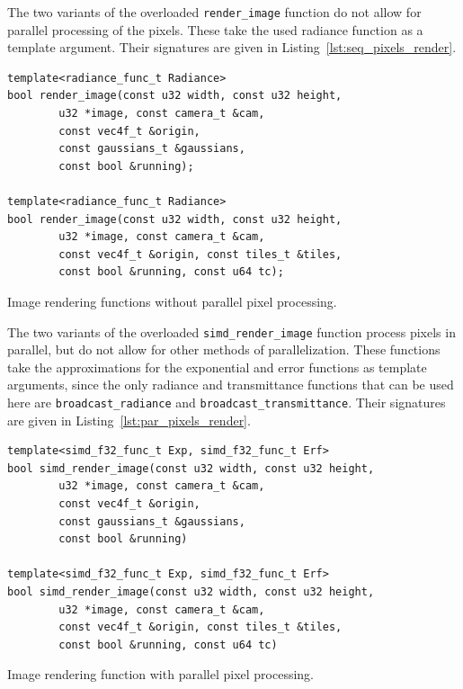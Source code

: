 \documentclass[a4paper, 11pt]{memoir}
\begin{document}
    The two variants of the overloaded \texttt{render_image} function do not allow for parallel processing of
    the pixels. These take the used \gls{radiance} function as a template argument. Their signatures are given in
    Listing~\ref{lst:seq_pixels_render}.

    \begin{listing}[t]
        \begin{verbatim}
template<radiance_func_t Radiance>
bool render_image(const u32 width, const u32 height,
        u32 *image, const camera_t &cam,
        const vec4f_t &origin,
        const gaussians_t &gaussians,
        const bool &running);

template<radiance_func_t Radiance>
bool render_image(const u32 width, const u32 height,
        u32 *image, const camera_t &cam,
        const vec4f_t &origin, const tiles_t &tiles,
        const bool &running, const u64 tc);
        \end{verbatim}
        \caption{Image rendering functions without parallel pixel processing.}
        \label{lst:seq_pixels_render}
    \end{listing}

    The two variants of the overloaded \texttt{simd_render_image} function process pixels in parallel, but do
    not allow for other methods of parallelization. These functions take the approximations for the exponential and error
    functions as template arguments, since the only \gls{radiance} and \gls{transmittance} functions that can be used
    here are \texttt{broadcast_radiance} and \texttt{broadcast_transmittance}. Their signatures are
    given in Listing~\ref{lst:par_pixels_render}.

    \begin{listing}[t]
        \begin{verbatim}
template<simd_f32_func_t Exp, simd_f32_func_t Erf>
bool simd_render_image(const u32 width, const u32 height,
        u32 *image, const camera_t &cam,
        const vec4f_t &origin,
        const gaussians_t &gaussians,
        const bool &running)

template<simd_f32_func_t Exp, simd_f32_func_t Erf>
bool simd_render_image(const u32 width, const u32 height,
        u32 *image, const camera_t &cam,
        const vec4f_t &origin, const tiles_t &tiles,
        const bool &running, const u64 tc)
        \end{verbatim}
        \caption{Image rendering function with parallel pixel processing.}
        \label{lst:par_pixels_render}
    \end{listing}
\end{document}

